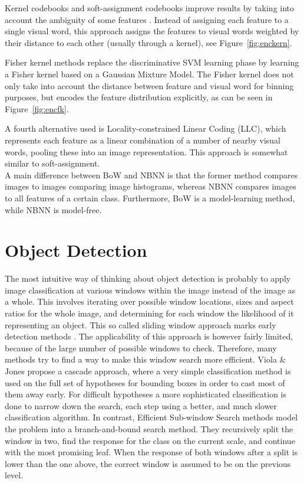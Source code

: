 Kernel codebooks and soft-assignment codebooks improve results by taking into account the ambiguity of some features \cite{liu2011defense, van2010visual}. Instead of assigning each feature to a single visual word, this approach assigns the features to visual words weighted by their distance to each other (usually through a kernel), see Figure~\ref{fig:enckern}.

Fisher kernel methods \cite{perronnin2010improving} replace the discriminative SVM learning phase by learning a Fisher kernel based on a Gaussian Mixture Model. The Fisher kernel does not only take into account the distance between feature and visual word for binning purposes, but encodes the feature distribution explicitly, as can be seen in Figure~\ref{fig:encfk}.

A fourth alternative used is Locality-constrained Linear Coding (LLC), \cite{wang2010locality} which represents each feature as a linear combination of a number of nearby visual words, pooling these into an image representation. This approach is somewhat similar to soft-assignment.\\

A main difference between BoW and NBNN is that the former method compares images to images comparing image histograms, whereas NBNN compares images to all features of a certain class. Furthermore, BoW is a model-learning method, while NBNN is model-free.


\section{Object Detection} %
\label{sec:object_detection}

The most intuitive way of thinking about object detection is probably to apply image classification at various windows within the image instead of the image as a whole. This involves iterating over possible window locations, sizes and aspect ratios for the whole image, and determining for each window the likelihood of it representing an object. This so called sliding window approach marks early detection methods \cite{viola2004robust}. The applicability of this approach is however fairly limited, because of the large number of possible windows to check. Therefore, many methods try to find a way to make this window search more efficient. Viola \& Jones \cite{viola2004robust} propose a cascade approach, where a very simple classification method is used on the full set of hypotheses for bounding boxes in order to cast most of them away early. For difficult hypotheses a more sophisticated classification is done to narrow down the search, each step using a better, and much slower classification algorithm. In contrast, Efficient Sub-window Search methods \cite{behmo2010towards, lampert2008beyond, pedersoli2011coarse, yeh2009fast} model the problem into a branch-and-bound search method. They recursively split the window in two, find the response for the class on the current scale, and continue with the most promising leaf. When the response of both windows after a split is lower than the one above, the correct window is assumed to be on the previous level.

